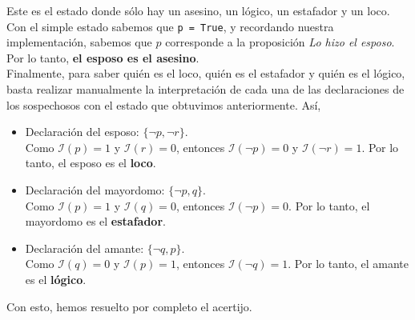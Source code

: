 \documentclass[letterpaper,12pt]{article}
\begin{document}
    \justify
    Este es el estado donde sólo hay un asesino, un lógico, un estafador 
    y un loco. Con el simple estado sabemos que \texttt{p = True}, y 
    recordando nuestra implementación, sabemos que $p$ corresponde a la 
    proposición \textit{Lo hizo el esposo}. Por lo tanto, 
    \textbf{el esposo es el asesino}. \\
    Finalmente, para saber quién es el loco, quién es el estafador y 
    quién es el lógico, basta realizar manualmente la interpretación de 
    cada una de las declaraciones de los sospechosos con el estado que 
    obtuvimos anteriormente. Así, 
    \begin{itemize}
        \item Declaración del esposo: $\{ \neg p, \neg r \}$. \\
        Como $\mathcal{I}(p) = 1$ y $\mathcal{I}(r) = 0$, entonces 
        $\mathcal{I}(\neg p) = 0$ y $\mathcal{I}(\neg r) = 1$. Por lo tanto,
        el esposo es el \textbf{loco}.
        \item Declaración del mayordomo: $\{\neg p, q \}$. \\
        Como $\mathcal{I}(p) = 1$ y $\mathcal{I}(q) = 0$, entonces 
        $\mathcal{I}(\neg p) = 0$. Por lo tanto, el mayordomo es el
        \textbf{estafador}.
        \item Declaración del amante: $\{\neg q, p \}$. \\
        Como $\mathcal{I}(q) = 0$ y $\mathcal{I}(p) = 1$, entonces 
        $\mathcal{I}(\neg q) = 1$. Por lo tanto, el amante es el 
        \textbf{lógico}. 
    \end{itemize}

    \justify
    Con esto, hemos resuelto por completo el acertijo.
    
\end{document}

